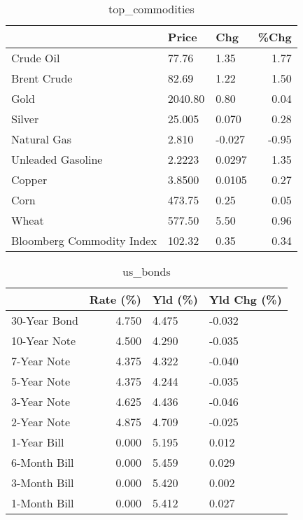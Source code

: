 \documentclass{article}%
\begin{document}
\begin{table}[htbp]%
\caption{top\_commodities}%
\centering%
\begin{adjustbox}{width=1\textwidth}%
\begin{tabular}{lllr}
\toprule
                          &   Price &    Chg &  \%Chg \\
\midrule
               Crude Oil  &   77.76 &   1.35 &  1.77 \\
             Brent Crude  &   82.69 &   1.22 &  1.50 \\
                    Gold  & 2040.80 &   0.80 &  0.04 \\
                  Silver  &  25.005 &  0.070 &  0.28 \\
             Natural Gas  &   2.810 & -0.027 & -0.95 \\
       Unleaded Gasoline  &  2.2223 & 0.0297 &  1.35 \\
                  Copper  &  3.8500 & 0.0105 &  0.27 \\
                    Corn  &  473.75 &   0.25 &  0.05 \\
                   Wheat  &  577.50 &   5.50 &  0.96 \\
Bloomberg Commodity Index &  102.32 &   0.35 &  0.34 \\
\bottomrule
\end{tabular}
%
\end{adjustbox}%
\end{table}

%


\begin{table}[htbp]%
\caption{us\_bonds}%
\centering%
\begin{adjustbox}{width=1\textwidth}%
\begin{tabular}{lrll}
\toprule
             &  Rate (\%) & Yld (\%) & Yld Chg (\%) \\
\midrule
30-Year Bond &     4.750 &   4.475 &      -0.032 \\
10-Year Note &     4.500 &   4.290 &      -0.035 \\
 7-Year Note &     4.375 &   4.322 &      -0.040 \\
 5-Year Note &     4.375 &   4.244 &      -0.035 \\
 3-Year Note &     4.625 &   4.436 &      -0.046 \\
 2-Year Note &     4.875 &   4.709 &      -0.025 \\
 1-Year Bill &     0.000 &   5.195 &       0.012 \\
6-Month Bill &     0.000 &   5.459 &       0.029 \\
3-Month Bill &     0.000 &   5.420 &       0.002 \\
1-Month Bill &     0.000 &   5.412 &       0.027 \\
\bottomrule
\end{tabular}
%
\end{adjustbox}%
\end{table}
\end{document}
